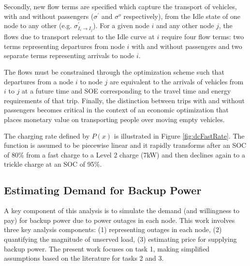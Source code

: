 \documentclass[journal]{IEEEtran}
\begin{document}
Secondly, new flow terms are specified which capture the transport of vehicles, with and without passengers ($\sigma^\prime$ and $\sigma^o$ respectively), from the Idle state of one node to any other (e.g. $\sigma_{I_i \rightarrow I_j}^\prime$). For a given node $i$ and any other node $j$, the flows due to transport relevant to the Idle curve at $i$ require four flow terms: two terms representing departures from node $i$ with and without passengers and two separate terms representing arrivals to node $i$. 

The flows must be constrained through the optimization scheme such that departures from a node $i$ to node $j$ are equivalent to the arrivals of vehicles from $i$ to $j$ at a future time and SOE corresponding to the travel time and energy requirements of that trip. Finally, the distinction between trips with and without passengers becomes critical in the context of an economic optimization that places monetary value on transporting people over moving empty vehicles.

The charging rate defined by $P(x)$ is illustrated in Figure \ref{fig:dcFastRate}. The function is assumed to be piecewise linear and it rapidly transforms after an SOC of 80\% from a fast charge to a Level 2 charge (7kW) and then declines again to a trickle charge at an SOC of 95\%.


\subsection{Estimating Demand for Backup Power}
A key component of this analysis is to simulate the demand (and willingness to pay) for backup power due to power outages in each node. This work involves three key analysis components: (1) representing outages in each node, (2) quantifying the magnitude of unserved load, (3) estimating price for supplying backup power. The present work focuses on task 1, making simplified assumptions based on the literature for tasks 2 and 3. 
\end{document}
